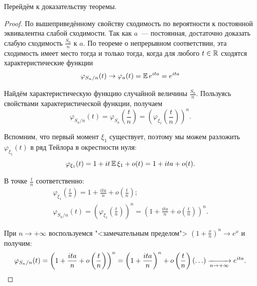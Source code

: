 Перейдём к доказательству теоремы.

\begin{proof}
    По вышеприведённому свойству сходимость по вероятности к постоянной эквивалентна слабой сходимости. 
    Так как $a$~--- постоянная, достаточно доказать слабую сходимость $\frac{S_{n}}{n}$ к $a$. 
    По теореме о непрерывном соответствии, эта сходимость имеет место тогда и только тогда, когда для любого $t \in \mathbb{R}$ сходятся характеристические функции
    \begin{equation*}
        \varphi_{S_{n} / n}(t) \to \varphi_{a}(t) =
        \operatorname{\mathbb{E}} e^{i t a}=e^{i t a}
    \end{equation*}
    
    Найдём характеристическую функцию случайной величины $\frac{S_{n}}{n}$. 
    Пользуясь свойствами характеристической функции, получаем
    \begin{equation*}
        \varphi_{S_{n} / n}(t) = 
        \varphi_{S_{n}}\left(\frac{t}{n}\right) =
        \left(\varphi_{\xi_{1}}\left(\frac{t}{n}\right)\right)^{n}.
    \end{equation*}
    
    Вспомним, что первый момент $\xi_{1}$ существует, поэтому мы можем разложить $\varphi_{\xi_{1}}(t)$ в ряд Тейлора в окрестности нуля:
    \begin{equation*}
        \varphi_{\xi_{1}}(t) = 1 + it\operatorname{\mathbb{E}} \xi_{1} + o(t)=1 + ita + o(t).
    \end{equation*}
    
    В точке $\frac{t}{n}$ соответственно:
    \begin{gather*}
        \varphi_{\xi_{1}}\left(\frac{t}{n}\right) = 
        1+\frac{i t a}{n}+o\left(\frac{t}{n}\right); \\
        \varphi_{S_{n} / n}(t)=\left(\varphi_{\xi_{1}}\left(\frac{t}{n}\right)\right)^{n} = 
        \left(1+\frac{i t a}{n}+o\left(\frac{t}{n}\right)\right)^{n}.
    \end{gather*}
    
    При $n \to +\infty$ воспользуемся "<замечательным пределом"> $\left(1+\frac{x}{n}\right)^{n} \to e^{x}$ и получим:
    \begin{equation*}
        \varphi_{S_{n} / n}(t) =
        \left(1 + \frac{ita}{n} + o\left(\frac{t}{n}\right)\right)^{n} =
        \left(1 + \frac{ita}{n}\right)^n + o\left(\frac{t}{n}\right)(\ldots)
        \xrightarrow[n \to +\infty]{} e^{i t a}. \qedhere
    \end{equation*}
\end{proof}
